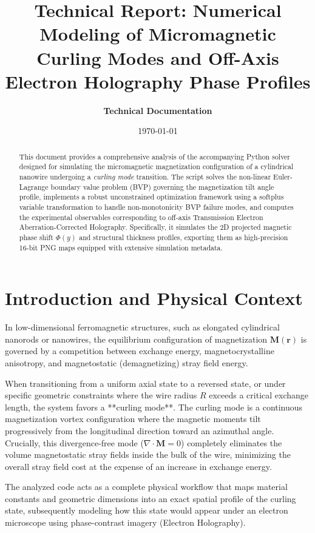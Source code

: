 \documentclass[11pt,a4paper]{article}
\title{\textbf{Technical Report: Numerical Modeling of Micromagnetic Curling Modes and Off-Axis Electron Holography Phase Profiles}}
\author{\textbf{Technical Documentation}}
\date{\today}
\begin{document}
\maketitle

\begin{abstract}
This document provides a comprehensive analysis of the accompanying Python solver designed for simulating the micromagnetic magnetization configuration of a cylindrical nanowire undergoing a \textit{curling mode} transition. The script solves the non-linear Euler-Lagrange boundary value problem (BVP) governing the magnetization tilt angle profile, implements a robust unconstrained optimization framework using a softplus variable transformation to handle non-monotonicity BVP failure modes, and computes the experimental observables corresponding to off-axis Transmission Electron Aberration-Corrected Holography. Specifically, it simulates the 2D projected magnetic phase shift $\Phi(y)$ and structural thickness profiles, exporting them as high-precision 16-bit PNG maps equipped with extensive simulation metadata.
\end{abstract}

\tableofcontents
\newpage

\section{Introduction and Physical Context}
In low-dimensional ferromagnetic structures, such as elongated cylindrical nanorods or nanowires, the equilibrium configuration of magnetization $\bm{M}(\bm{r})$ is governed by a competition between exchange energy, magnetocrystalline anisotropy, and magnetostatic (demagnetizing) stray field energy. 

When transitioning from a uniform axial state to a reversed state, or under specific geometric constraints where the wire radius $R$ exceeds a critical exchange length, the system favors a **curling mode**. The curling mode is a continuous magnetization vortex configuration where the magnetic moments tilt progressively from the longitudinal direction toward an azimuthal angle. Crucially, this divergence-free mode ($\nabla \cdot \bm{M} = 0$) completely eliminates the volume magnetostatic stray fields inside the bulk of the wire, minimizing the overall stray field cost at the expense of an increase in exchange energy.

The analyzed code acts as a complete physical workflow that maps material constants and geometric dimensions into an exact spatial profile of the curling state, subsequently modeling how this state would appear under an electron microscope using phase-contrast imagery (Electron Holography).
\end{document}

